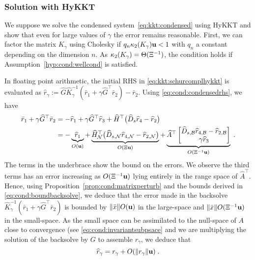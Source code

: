 \subsubsection{Solution with HyKKT}
We suppose we solve the condensed system~\eqref{eq:kkt:condensed} using HyKKT
and show that even for large values of $\gamma$ the error remains reasonable.
First, we can factor the matrix $K_\gamma$ using Cholesky if $q_n \kappa_2(K_\gamma) \mathbf{u} < 1$
with $q_n$ a constant depending on the dimension $n$. As $\kappa_2(K_\gamma) = \Theta(\Xi^{-1})$,
the condition holds if Assumption~\ref{hyp:cond:wellcond} is satisfied.

In floating point arithmetic, the initial RHS in \eqref{eq:kkt:schurcomplhykkt}
is evaluated as
$\widehat{r}_\gamma :=\widehat{G} \widehat{K}_\gamma^{-1} (\bar{r}_1 + \gamma \widehat{G}^\top \bar{r}_2) - \bar{r}_2$. Using \eqref{eq:cond:condensedrhs}, we have
\begin{equation}
  \label{eq:cond:boundderivationhykkt}
  \begin{aligned}
  \bar{r}_1 + \gamma \widehat{G}^\top \bar{r}_2 &=
- \widehat{r}_1 + \gamma \widehat{G}^\top \widehat{r}_3+ \widehat{H}^\top\big(\widehat{D}_{s} \widehat{r}_{4} - \widehat{r}_{2} \big) \\
&=  -
\underbrace{\widehat{r}_1}_{O(\mathbf{u})} +
\underbrace{
\widehat{H}_{\mathcal{N}}^\top\big(\widehat{D}_{s,\mathcal{N}} \widehat{r}_{4,\mathcal{N}} - \widehat{r}_{2,\mathcal{N}} \big)}_{O(\Xi \mathbf{u})}
+ \underbrace{\widehat{A}^\top \begin{bmatrix}
  \widehat{D}_{s,\mathcal{B}} \widehat{r}_{4,\mathcal{B}} - \widehat{r}_{2,\mathcal{B}}  \\
  \gamma \widehat{r}_3
\end{bmatrix}}_{O(\Xi^{-1}\mathbf{u})} \; .
  \end{aligned}
\end{equation}
The terms in the underbrace show the bound on the errors. We observe the third terms
has an error increasing as $O(\Xi^{-1} \mathbf{u})$
lying entirely in the range space of $\widehat{A}^\top$.
Hence, using Proposition~\ref{prop:cond:matrixperturb} and the bounds derived in \eqref{eq:cond:boundbacksolve}, we deduce
that the error made in the backsolve $\widehat{K}_\gamma^{-1}(\bar{r}_1 + \gamma \widehat{G}^\top \bar{r}_2)$
is bounded by $\|\bar{x}\|O(\mathbf{u})$ in the large-space and $\|\bar{x}\|O(\Xi^{-1}\mathbf{u})$
in the small-space. As the small space can be assimilated to the null-space of $A$ close
to convergence (see \eqref{eq:cond:invariantsubpsace} and we are multiplying the solution
of the backsolve by $G$ to assemble $r_\gamma$, we deduce that
\begin{equation}
  \widehat{r}_\gamma = r_\gamma + O(\| r_\gamma \| \mathbf{u}) \; .
\end{equation}

